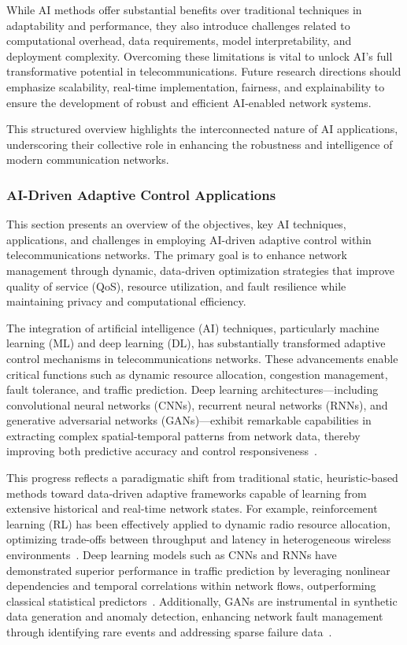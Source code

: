 \documentclass[sigconf]{acmart}
\begin{document}
While AI methods offer substantial benefits over traditional techniques in adaptability and performance, they also introduce challenges related to computational overhead, data requirements, model interpretability, and deployment complexity. Overcoming these limitations is vital to unlock AI's full transformative potential in telecommunications. Future research directions should emphasize scalability, real-time implementation, fairness, and explainability to ensure the development of robust and efficient AI-enabled network systems.

This structured overview highlights the interconnected nature of AI applications, underscoring their collective role in enhancing the robustness and intelligence of modern communication networks.

\subsubsection{AI-Driven Adaptive Control Applications}

This section presents an overview of the objectives, key AI techniques, applications, and challenges in employing AI-driven adaptive control within telecommunications networks. The primary goal is to enhance network management through dynamic, data-driven optimization strategies that improve quality of service (QoS), resource utilization, and fault resilience while maintaining privacy and computational efficiency.

The integration of artificial intelligence (AI) techniques, particularly machine learning (ML) and deep learning (DL), has substantially transformed adaptive control mechanisms in telecommunications networks. These advancements enable critical functions such as dynamic resource allocation, congestion management, fault tolerance, and traffic prediction. Deep learning architectures—including convolutional neural networks (CNNs), recurrent neural networks (RNNs), and generative adversarial networks (GANs)—exhibit remarkable capabilities in extracting complex spatial-temporal patterns from network data, thereby improving both predictive accuracy and control responsiveness~\cite{ref1,ref2,ref3,ref5,ref6,ref10,ref11,ref14,ref50}.

This progress reflects a paradigmatic shift from traditional static, heuristic-based methods toward data-driven adaptive frameworks capable of learning from extensive historical and real-time network states. For example, reinforcement learning (RL) has been effectively applied to dynamic radio resource allocation, optimizing trade-offs between throughput and latency in heterogeneous wireless environments~\cite{ref1,ref7}. Deep learning models such as CNNs and RNNs have demonstrated superior performance in traffic prediction by leveraging nonlinear dependencies and temporal correlations within network flows, outperforming classical statistical predictors~\cite{ref2,ref3,ref5}. Additionally, GANs are instrumental in synthetic data generation and anomaly detection, enhancing network fault management through identifying rare events and addressing sparse failure data~\cite{ref6,ref10}.
\end{document}
